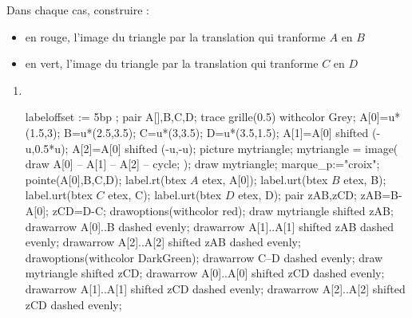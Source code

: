 \begin{corrige}
    Dans chaque cas, construire :
    \begin{itemize}
        \item en rouge, l'image du triangle par la translation qui tranforme $A$ en $B$
        \item en vert, l'image du triangle par la translation qui tranforme $C$ en $D$
    \end{itemize}
    \begin{changemargin}{-15mm}{0mm}
        \begin{multicols}{2}
            \begin{enumerate}
                \item \phantom{rrr}\\
                \begin{Geometrie}[CoinHD={(4u,4u)}]
                    labeloffset := 5bp ;
                    pair A[],B,C,D;                    
                    trace grille(0.5) withcolor Grey;
                    A[0]=u*(1.5,3);
                    B=u*(2.5,3.5);
                    C=u*(3,3.5);
                    D=u*(3.5,1.5);
                    A[1]=A[0] shifted (-u,0.5*u);
                    A[2]=A[0] shifted (-u,-u);
                    picture mytriangle;
                    mytriangle = image( 
                        draw A[0] -- A[1] -- A[2] -- cycle;
                    );
                    draw mytriangle;
                    marque_p:="croix";
                    pointe(A[0],B,C,D);
                    label.rt(btex $A$ etex, A[0]);
                    label.urt(btex $B$ etex, B);
                    label.urt(btex $C$ etex, C);
                    label.urt(btex $D$ etex, D);
                    pair zAB,zCD;
                    zAB=B-A[0];
                    zCD=D-C;
                    drawoptions(withcolor red);
                    draw mytriangle shifted zAB;
                    drawarrow A[0]..B dashed evenly;
                    drawarrow A[1]..A[1] shifted zAB dashed evenly;
                    drawarrow A[2]..A[2] shifted zAB dashed evenly;
                    drawoptions(withcolor DarkGreen);
                    drawarrow C--D dashed evenly;
                    draw mytriangle shifted zCD;
                    drawarrow A[0]..A[0] shifted zCD dashed evenly;
                    drawarrow A[1]..A[1] shifted zCD dashed evenly;
                    drawarrow A[2]..A[2] shifted zCD dashed evenly;

\end{Geometrie}
\end{enumerate}
\end{multicols}
\end{changemargin}
\end{corrige}
